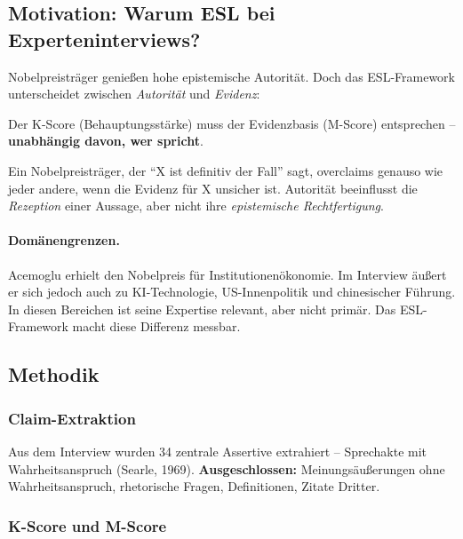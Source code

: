 \subsection{Motivation: Warum ESL bei Experteninterviews?}

Nobelpreistr\"ager genie{\ss}en hohe epistemische Autorit\"at. Doch das ESL-Framework unterscheidet zwischen \emph{Autorit\"at} und \emph{Evidenz}:

\begin{principlebox}
Der K-Score (Behauptungsst\"arke) muss der Evidenzbasis (M-Score) entsprechen -- \textbf{unabh\"angig davon, wer spricht}.
\end{principlebox}

Ein Nobelpreistr\"ager, der ``X ist definitiv der Fall'' sagt, overclaims genauso wie jeder andere, wenn die Evidenz f\"ur X unsicher ist. Autorit\"at beeinflusst die \emph{Rezeption} einer Aussage, aber nicht ihre \emph{epistemische Rechtfertigung}.

\paragraph{Dom\"anengrenzen.} Acemoglu erhielt den Nobelpreis f\"ur Institutionen\"okonomie. Im Interview \"au{\ss}ert er sich jedoch auch zu KI-Technologie, US-Innenpolitik und chinesischer F\"uhrung. In diesen Bereichen ist seine Expertise relevant, aber nicht prim\"ar. Das ESL-Framework macht diese Differenz messbar.


\subsection{Methodik}

\subsubsection{Claim-Extraktion}

Aus dem Interview wurden 34 zentrale Assertive extrahiert -- Sprechakte mit Wahrheitsanspruch (Searle, 1969). \textbf{Ausgeschlossen:} Meinungs\"au{\ss}erungen ohne Wahrheitsanspruch, rhetorische Fragen, Definitionen, Zitate Dritter.

\subsubsection{K-Score und M-Score}

